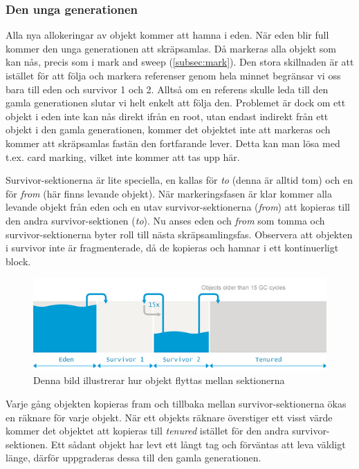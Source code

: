 \documentclass[12pt,a4paper]{article}
\begin{document}
\subsubsection{Den unga generationen}
\label{subsubsec:young}

Alla nya allokeringar av objekt kommer att hamna i eden. När eden blir
full kommer den unga generationen att skräpsamlas. Då markeras alla
objekt som kan nås, precis som i mark and sweep (\ref{subsec:mark}).
Den stora skillnaden är att istället för att följa och markera
referenser genom hela minnet begränsar vi oss bara till eden och
survivor 1 och 2. Alltså om en referens skulle leda till den gamla
generationen slutar vi helt enkelt att följa den. Problemet är dock om
ett objekt i eden inte kan nås direkt ifrån en root, utan endast
indirekt från ett objekt i den gamla generationen, kommer det objektet
inte att markeras och kommer att skräpsamlas fastän den fortfarande
lever. Detta kan man lösa med t.ex. card marking, vilket inte kommer
att tas upp här.

Survivor-sektionerna är lite speciella, en kallas för \textit{to}
(denna är alltid tom) och en för \textit{from} (här finns levande
objekt). När markeringsfasen är klar kommer alla levande objekt från
eden och en utav survivor-sektionerna (\textit{from}) att kopieras
till den andra survivor-sektionen (\textit{to}). Nu anses eden och
\textit{from} som tomma och survivor-sektionerna byter roll till nästa
skräpsamlingsfas. Observera att objekten i survivor inte är
fragmenterade, då de kopieras och hamnar i ett kontinuerligt block.

\begin{figure}[H]
  \centering
  \includegraphics[width=\textwidth]{ggc_survivor.png}
  \caption{\label{fig:survivor} Denna bild illustrerar hur objekt flyttas mellan sektionerna}
\end{figure}


Varje gång objekten kopieras fram och tillbaka mellan
survivor-sektionerna ökas en räknare för varje objekt. När ett objekts
räknare överstiger ett visst värde kommer det objektet att kopieras
till \textit{tenured} istället för den andra survivor-sektionen. Ett
sådant objekt har levt ett långt tag och förväntas att leva väldigt
länge, därför uppgraderas dessa till den gamla generationen. 
\end{document}
